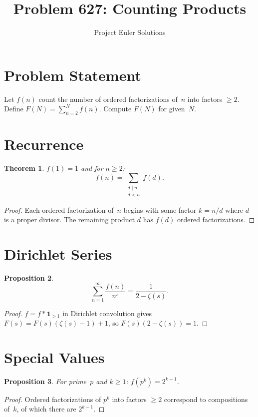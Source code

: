 \documentclass[11pt]{article}
\title{Problem 627: Counting Products}
\author{Project Euler Solutions}
\date{}
\newtheorem{theorem}{Theorem}
\newtheorem{proposition}[theorem]{Proposition}
\begin{document}
\maketitle

\section{Problem Statement}

Let $f(n)$ count the number of ordered factorizations of~$n$ into factors $\ge 2$. Define $F(N) = \sum_{n=2}^N f(n)$. Compute $F(N)$ for given~$N$.

\section{Recurrence}

\begin{theorem}
$f(1) = 1$ and for $n \ge 2$:
\[
f(n) = \sum_{\substack{d \mid n \\ d < n}} f(d).
\]
\end{theorem}

\begin{proof}
Each ordered factorization of~$n$ begins with some factor $k = n/d$ where $d$ is a proper divisor. The remaining product $d$ has $f(d)$ ordered factorizations.
\end{proof}

\section{Dirichlet Series}

\begin{proposition}
\[
\sum_{n=1}^{\infty} \frac{f(n)}{n^s} = \frac{1}{2 - \zeta(s)}.
\]
\end{proposition}

\begin{proof}
$f = f * \mathbf{1}_{>1}$ in Dirichlet convolution gives $F(s) = F(s)(\zeta(s)-1) + 1$, so $F(s)(2-\zeta(s)) = 1$.
\end{proof}

\section{Special Values}

\begin{proposition}
For prime~$p$ and $k \ge 1$: $f(p^k) = 2^{k-1}$.
\end{proposition}

\begin{proof}
Ordered factorizations of $p^k$ into factors $\ge 2$ correspond to compositions of~$k$, of which there are $2^{k-1}$.
\end{proof}
\end{document}
